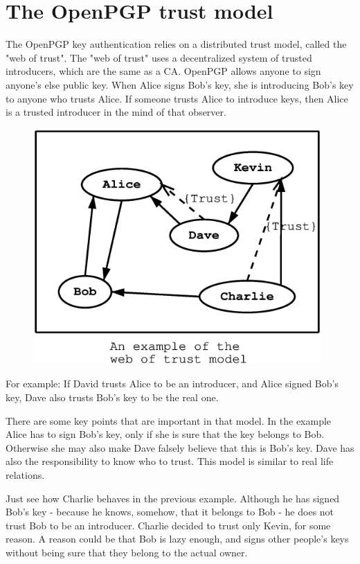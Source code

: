 


\section{The OpenPGP trust model}
\label{pgp:trust}

The OpenPGP key authentication relies on a distributed trust model, called
the "web of trust". The "web of trust" uses a decentralized system of 
trusted introducers, which are the same as a CA. OpenPGP allows anyone to 
sign anyone's else public key. When Alice signs Bob's key, she is introducing 
Bob's key to anyone who trusts Alice. If someone trusts Alice to introduce
keys, then Alice is a trusted introducer in the mind of that observer.

\begin{figure}[hbtp]
\includegraphics[height=9cm,width=11cm]{pgp-fig1}
\label{fig:pgp1}
\end{figure}

For example: If David trusts Alice to be an introducer, and Alice signed
Bob's key, Dave also trusts Bob's key to be the real one.

There are some key points that are important in that model. In the example
Alice has to sign Bob's key, only if she is sure that the key belongs
to Bob. Otherwise she may also make Dave falsely believe that this
is Bob's key. Dave has also the responsibility to know who to trust.
This model is similar to real life relations.

Just see how Charlie behaves in the previous example. Although he has 
signed Bob's key - because he knows, somehow, that it belongs to Bob - 
he does not trust Bob to be an introducer. Charlie decided to trust only 
Kevin, for some reason. A reason could be that Bob is lazy enough, and 
signs other people's keys without being sure that they belong to the 
actual owner.


